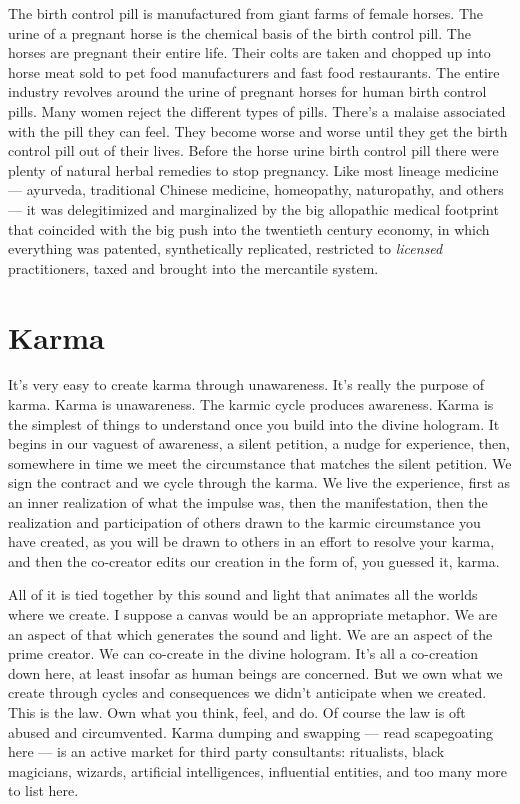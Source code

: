 \documentclass[letterpaper,9pt,twoside,titlepage,onecolumn,openany]{book}
\begin{document}
The birth control pill is manufactured from giant farms of female
horses. The urine of a pregnant horse is the chemical basis of the birth
control pill. The horses are pregnant their entire life. Their colts are
taken and chopped up into horse meat sold to pet food manufacturers and
fast food restaurants. The entire industry revolves around the urine of
pregnant horses for human birth control pills. Many women reject the
different types of pills. There's a malaise associated with the pill
they can feel. They become worse and worse until they get the birth
control pill out of their lives. Before the horse urine birth control
pill there were plenty of natural herbal remedies to stop pregnancy.
Like most lineage medicine --- ayurveda, traditional Chinese medicine,
homeopathy, naturopathy, and others --- it was delegitimized and
marginalized by the big allopathic medical footprint that coincided with
the big push into the twentieth century economy, in which everything was
patented, synthetically replicated, restricted to \emph{licensed}
practitioners, taxed and brought into the mercantile system.

\section*{Karma}\label{karma}

It's very easy to create karma through unawareness. It's really the
purpose of karma. Karma is unawareness. The karmic cycle produces
awareness. Karma is the simplest of things to understand once you build
into the divine hologram. It begins in our vaguest of awareness, a
silent petition, a nudge for experience, then, somewhere in time we meet
the circumstance that matches the silent petition. We sign the contract
and we cycle through the karma. We live the experience, first as an
inner realization of what the impulse was, then the manifestation, then
the realization and participation of others drawn to the karmic
circumstance you have created, as you will be drawn to others in an
effort to resolve your karma, and then the co-creator edits our creation
in the form of, you guessed it, karma.

All of it is tied together by this sound and light that animates all the
worlds where we create. I suppose a canvas would be an appropriate
metaphor. We are an aspect of that which generates the sound and light.
We are an aspect of the prime creator. We can co-create in the divine
hologram. It's all a co-creation down here, at least insofar as human
beings are concerned. But we own what we create through cycles and
consequences we didn't anticipate when we created. This is the law. Own
what you think, feel, and do. Of course the law is oft abused and
circumvented. Karma dumping and swapping --- read scapegoating here ---
is an active market for third party consultants: ritualists, black
magicians, wizards, artificial intelligences, influential entities, and
too many more to list here.
\end{document}
